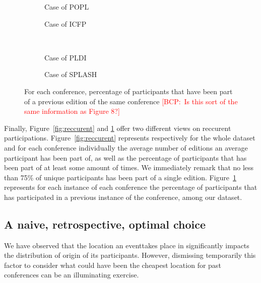 \documentclass[manuscript, review, screen]{acmart}
\newcommand{\bcp}[1]{\textcolor{red}{{[BCP:~#1]}}}
\newcommand{\bcp}[1]{}
\newcommand{\event}{event} %
\begin{document}
\begin{figure}
  \centering
  \begin{subfigure}[b]{0.4\textwidth}
    \centering
    \caption{Case of POPL}
  \end{subfigure}
  \begin{subfigure}[b]{0.4\textwidth}
    \centering
    \caption{Case of ICFP}
  \end{subfigure}
  \\
  \begin{subfigure}[b]{0.4\textwidth}
    \centering
    \caption{Case of PLDI}
  \end{subfigure}
  \begin{subfigure}[b]{0.4\textwidth}
    \centering
    \caption{Case of SPLASH}
  \end{subfigure}
  \caption{For each conference, percentage of participants that have been
    part of a previous edition of the same conference \bcp{Is this sort of
      the same information as Figure 8?}}
  \label{fig:old-timers}
\end{figure}

Finally, Figure~\ref{fig:reccurent} and \ref{fig:old-timers} offer two different views on reccurent participations. Figure~\ref{fig:reccurent} represents respectively for the whole dataset and for each conference individually the average number of editions an average participant has been part of, as well as the percentage of participants that has been part of at least some amount of times. We immediately remark that no less than 75\% of unique participants has been part of a single edition.
Figure~\ref{fig:old-timers} represents for each instance of each conference the percentage of participants that has participated in a previous instance of the conference, among our dataset.

\subsection{A naive, retrospective, optimal choice}

We have observed that the location an \event takes place in significantly
impacts the distribution of origin of its participants. However, dismissing
temporarily this factor to consider what could have been the cheapest location
for past conferences can be an illuminating exercise.
\end{document}
